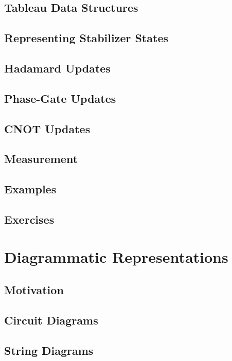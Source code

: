 \documentclass[11pt,a4paper]{article}
\begin{document}
\subsection{Tableau Data Structures}

\subsection{Representing Stabilizer States}

\subsection{Hadamard Updates}

\subsection{Phase-Gate Updates}

\subsection{CNOT Updates}

\subsection{Measurement}

\subsection{Examples}

\subsection{Exercises}


\section{Diagrammatic Representations}

\subsection{Motivation}

\subsection{Circuit Diagrams}

\subsection{String Diagrams}
\end{document}
